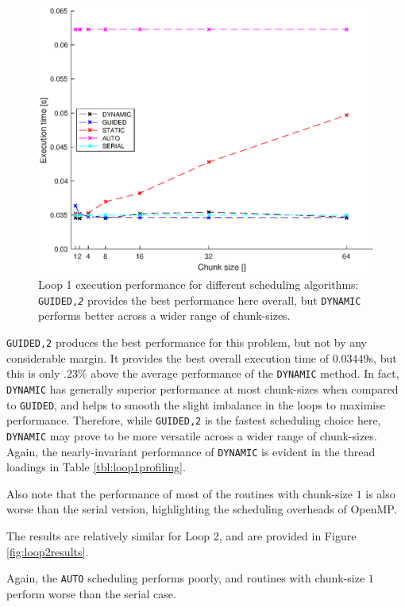 \documentclass{article} %
\newcommand{\tp}{\texttt}
\begin{document}
\begin{figure}
    \centering
    \includegraphics[height=.35\textheight]{part1_plots/all_part1.eps}
    \caption{Loop 1 execution performance for different scheduling algorithms: \tp{GUIDED,\textit{2}} provides the best performance here overall, but \tp{DYNAMIC} performs better across a wider range of chunk-sizes.}
    \label{fig:loop1results}
\end{figure} 

\tp{GUIDED,2} produces the best performance for this problem, but not by any considerable margin.
It provides the best overall execution time of $0.03449$s, but this is only $.23\%$ above the average performance of the \tp{DYNAMIC} method. 
In fact, \tp{DYNAMIC} has generally superior performance at most chunk-sizes when compared to \tp{GUIDED}, and helps to smooth the slight imbalance in the loops to maximise performance.
Therefore, while \tp{GUIDED,2} is the fastest scheduling choice here, \tp{DYNAMIC} may prove to be more versatile across a wider range of chunk-sizes.
Again, the nearly-invariant performance of \tp{DYNAMIC} is evident in the thread loadings in Table \ref{tbl:loop1profiling}.

Also note that the performance of most of the routines with chunk-size $1$ is also worse than the serial version, highlighting the scheduling overheads of OpenMP.

The results are relatively similar for Loop 2, and are provided in Figure \ref{fig:loop2results}. 

Again, the \tp{AUTO} scheduling performs poorly, and routines with chunk-size $1$ perform worse than the serial case.
\end{document}
